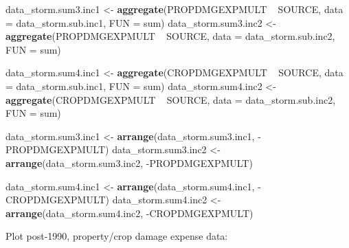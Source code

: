 \documentclass[]{article}
\newenvironment{Shaded}{\begin{snugshade}}{\end{snugshade}}
\newcommand{\KeywordTok}[1]{\textcolor[rgb]{0.13,0.29,0.53}{\textbf{{#1}}}}
\newcommand{\DataTypeTok}[1]{\textcolor[rgb]{0.13,0.29,0.53}{{#1}}}
\newcommand{\StringTok}[1]{\textcolor[rgb]{0.31,0.60,0.02}{{#1}}}
\newcommand{\NormalTok}[1]{{#1}}
\begin{document}
\begin{Shaded}
\begin{Highlighting}[]
\NormalTok{data_storm.sum3.inc1 <-}\StringTok{ }\KeywordTok{aggregate}\NormalTok{(PROPDMGEXPMULT ~}\StringTok{ }\NormalTok{SOURCE, }\DataTypeTok{data =} \NormalTok{data_storm.sub.inc1, }\DataTypeTok{FUN =} \NormalTok{sum)}
\NormalTok{data_storm.sum3.inc2 <-}\StringTok{ }\KeywordTok{aggregate}\NormalTok{(PROPDMGEXPMULT ~}\StringTok{ }\NormalTok{SOURCE, }\DataTypeTok{data =} \NormalTok{data_storm.sub.inc2, }\DataTypeTok{FUN =} \NormalTok{sum)}

\NormalTok{data_storm.sum4.inc1 <-}\StringTok{ }\KeywordTok{aggregate}\NormalTok{(CROPDMGEXPMULT ~}\StringTok{ }\NormalTok{SOURCE, }\DataTypeTok{data =} \NormalTok{data_storm.sub.inc1, }\DataTypeTok{FUN =} \NormalTok{sum)}
\NormalTok{data_storm.sum4.inc2 <-}\StringTok{ }\KeywordTok{aggregate}\NormalTok{(CROPDMGEXPMULT ~}\StringTok{ }\NormalTok{SOURCE, }\DataTypeTok{data =} \NormalTok{data_storm.sub.inc2, }\DataTypeTok{FUN =} \NormalTok{sum)}

\NormalTok{data_storm.sum3.inc1 <-}\StringTok{ }\KeywordTok{arrange}\NormalTok{(data_storm.sum3.inc1, -PROPDMGEXPMULT)}
\NormalTok{data_storm.sum3.inc2 <-}\StringTok{ }\KeywordTok{arrange}\NormalTok{(data_storm.sum3.inc2, -PROPDMGEXPMULT)}

\NormalTok{data_storm.sum4.inc1 <-}\StringTok{ }\KeywordTok{arrange}\NormalTok{(data_storm.sum4.inc1, -CROPDMGEXPMULT)}
\NormalTok{data_storm.sum4.inc2 <-}\StringTok{ }\KeywordTok{arrange}\NormalTok{(data_storm.sum4.inc2, -CROPDMGEXPMULT)}
\end{Highlighting}
\end{Shaded}

Plot post-1990, property/crop damage expense data:
\end{document}

